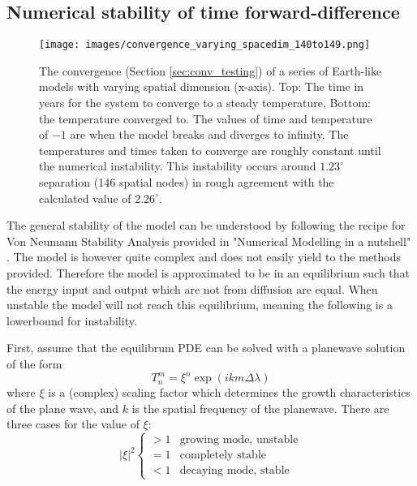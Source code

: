 \documentclass[12pt, onecolumn]{revtex4-2}    %
\begin{document}
\subsection{Numerical stability of time forward-difference} \label{sec:numerical_stability}

\begin{figure}[ht]
    \texttt{[image: images/convergence\_varying\_spacedim\_140to149.png]}
    \caption{The convergence (Section \ref{sec:conv_testing}) of a series of Earth-like models with varying spatial dimension (x-axis). Top: The time in years for the system to converge to a steady temperature, Bottom: the temperature converged to.
        The values of time and temperature of $-1$ are when the model breaks and diverges to infinity.
        The temperatures and times taken to converge are roughly constant until the numerical instability.
        This instability occurs around $1.23^{\circ}$ separation (146 spatial nodes) in rough agreement with the calculated value of $2.26^{\circ}$. }
    \label{fig:conv_spacedim}
\end{figure}

The general stability of the model can be understood by following the recipe for Von Neumann Stability Analysis provided in "Numerical Modelling in a nutshell" \cite{NumericalModelling}.
The model is however quite complex and does not easily yield to the methods provided.
Therefore the model is approximated to be in an equilibrium such that the energy input and output which are not from diffusion are equal.
When unstable the model will not reach this equilibrium, meaning the following is a lowerbound for instability.

First, assume that the equilibrum PDE can be solved with a planewave solution of the form
\begin{equation} \label{eq:trial_plane_wave}
    T^m_n = \xi^n \exp{(i k m \Delta\lambda)}
\end{equation}
where $\xi$ is a (complex) scaling factor which determines the growth characteristics of the plane wave, and $k$ is the spatial frequency of the planewave.
There are three cases for the value of $\xi$:
\begin{equation}\label{eq:stability_cases}
    |\xi|^2
    \begin{cases}
        > 1 & \text{growing mode, unstable} \\
        = 1 & \text{completely stable}      \\
        < 1 & \text{decaying mode, stable}
    \end{cases}
\end{equation}
\end{document}
